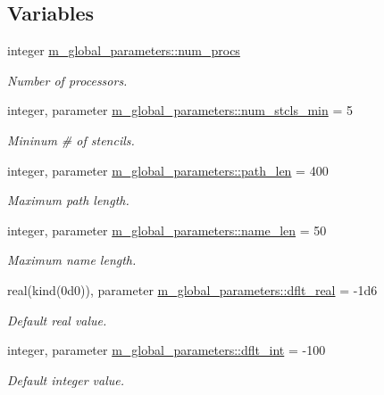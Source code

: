 \subsection*{Variables}
\begin{DoxyCompactItemize}
\item 
integer \hyperlink{namespacem__global__parameters_aafb65952c33f1c363d1040bde29734ea}{m\+\_\+global\+\_\+parameters\+::num\+\_\+procs}
\begin{DoxyCompactList}\small\item\em Number of processors. \end{DoxyCompactList}\item 
integer, parameter \hyperlink{namespacem__global__parameters_a71f091e6074e6c248fd7e03218b89218}{m\+\_\+global\+\_\+parameters\+::num\+\_\+stcls\+\_\+min} = 5
\begin{DoxyCompactList}\small\item\em Mininum \# of stencils. \end{DoxyCompactList}\item 
integer, parameter \hyperlink{namespacem__global__parameters_aa9d578c318044b2f2ec990b5fc0dfab9}{m\+\_\+global\+\_\+parameters\+::path\+\_\+len} = 400
\begin{DoxyCompactList}\small\item\em Maximum path length. \end{DoxyCompactList}\item 
integer, parameter \hyperlink{namespacem__global__parameters_ac8252b115e717c6f1c8595be6f897df7}{m\+\_\+global\+\_\+parameters\+::name\+\_\+len} = 50
\begin{DoxyCompactList}\small\item\em Maximum name length. \end{DoxyCompactList}\item 
real(kind(0d0)), parameter \hyperlink{namespacem__global__parameters_a99ba7e33a1870ac89386d376e0d20526}{m\+\_\+global\+\_\+parameters\+::dflt\+\_\+real} = -\/1d6
\begin{DoxyCompactList}\small\item\em Default real value. \end{DoxyCompactList}\item 
integer, parameter \hyperlink{namespacem__global__parameters_a4e4e3806190a62a77cf6542f6d07dbbd}{m\+\_\+global\+\_\+parameters\+::dflt\+\_\+int} = -\/100
\begin{DoxyCompactList}\small\item\em Default integer value. \end{DoxyCompactList}\item 

\end{DoxyCompactItemize}
